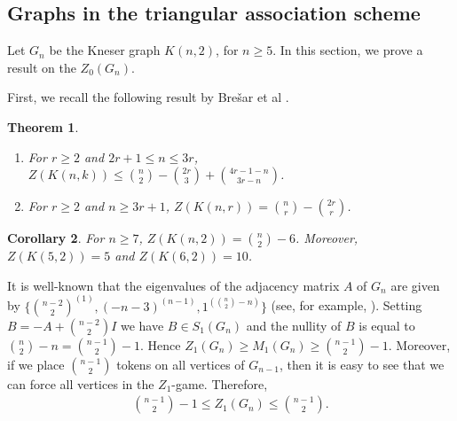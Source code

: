 \documentclass[3p,times,12pt]{article}
\newtheorem{theorem}{Theorem}[section]
\newtheorem{cor}[theorem]{Corollary}
\begin{document}
	
	
	
	\subsection{Graphs in the triangular association scheme}
	Let $G_n$ be the Kneser graph $K(n,2)$, for $n\geq 5$. In this section, we prove a result on the $Z_0(G_n)$.
	
	First, we recall the following result by Bre\v{s}ar et al \cite{brevsar2019grundy}.
	
	\begin{theorem}
		\hfil
		\begin{enumerate}
			\item For $r\geq 2$ and $2r+1 \leq n \leq 3r$, $Z(K(n,k)) \leq \binom{n}{2} - \binom{2r}{3} + \binom{4r-1-n}{3r-n}$.
			\item For $r\geq 2$ and $n\geq 3r+1$, $Z(K(n,r))= \binom{n}{r}- \binom{2r}{r}$.
		\end{enumerate}
	\end{theorem}

	\begin{cor}
		For $n\geq 7$, $Z(K(n,2)) = \binom{n}{2} - 6$. Moreover, $Z(K(5,2)) = 5$ and $Z(K(6,2)) = 10$.
	\end{cor}

	It is well-known that the eigenvalues of the adjacency matrix $A$ of $G_n$  are given by $\{\binom{n-2}{2}^{(1)}, (-n-3)^{(n-1)}, 1^{(\binom{n}{2}-n)}\}$ (see, for example, \cite{GM}). Setting $B = -A + \binom{n-2}{2}I$ we have $B \in S_{1}(G_n)$ and the nullity of $B$ is equal to  $\binom{n}{2}-n = \binom{n-1}{2}-1$. Hence $Z_1(G_n) \geq M_{1}(G_n) \geq  \binom{n-1}{2}-1$.
Moreover, if we place $\binom{n-1}{2}$ tokens on all vertices of $G_{n-1}$,
then it is easy to see that we can force all vertices in the $Z_1$-game. Therefore,
	\begin{align*}
		\binom{n-1}{2}-1 \leq Z_1(G_n) \leq \binom{n-1}{2}.
	\end{align*}
	
\end{document}

